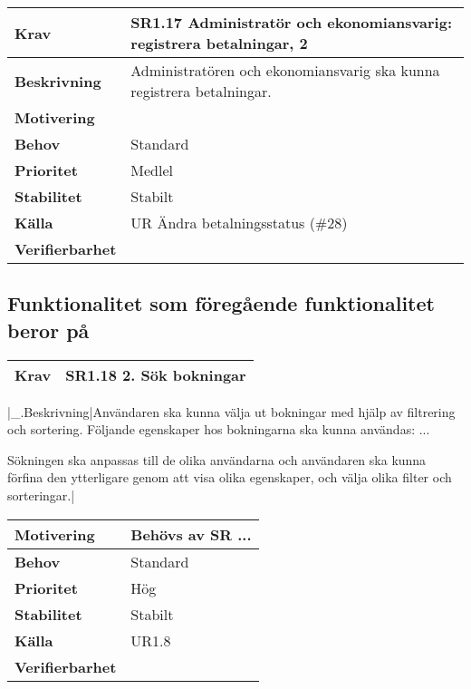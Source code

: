 \documentclass[a4paper, twoside, 11pt, titlepage]{article}
\begin{document}
	\begin{tabular} { p{2.6cm} p{12.5cm} }
		\hline
		\sffamily\textbf{Krav} & \sffamily\textbf{SR1.17 Administratör och ekonomiansvarig: registrera betalningar, 2 } \\
		\hline
		\sffamily\textbf{Beskrivning} & Administratören och ekonomiansvarig ska kunna registrera betalningar.  \\
		\hline
		\sffamily\textbf{Motivering} &   \\
		\hline
		\sffamily\textbf{Behov} & Standard  \\
		\hline
		\sffamily\textbf{Prioritet} & Medlel  \\
		\hline
		\sffamily\textbf{Stabilitet} & Stabilt  \\
		\hline
		\sffamily\textbf{Källa} & UR Ändra betalningsstatus (\#28)  \\
		\hline
		\sffamily\textbf{Verifierbarhet} &   \\
		\hline
	\end{tabular}


	\subsection{Funktionalitet som föregående funktionalitet beror på}


	\begin{tabular} { p{2.6cm} p{12.5cm} }
		\hline
		\sffamily\textbf{Krav} & \sffamily\textbf{SR1.18 2. Sök bokningar } \\
		\hline
	\end{tabular}
	\vspace{6mm}

	|\_.Beskrivning|Användaren ska kunna välja ut bokningar med hjälp av filtrering och sortering. Följande egenskaper hos bokningarna ska kunna användas: ...

	Sökningen ska anpassas till de olika användarna och användaren ska kunna förfina den ytterligare genom att visa olika egenskaper, och välja olika filter och sorteringar.|

	\begin{tabular} { p{2.6cm} p{12.5cm} }
		\hline
		\sffamily\textbf{Motivering} & Behövs av SR ...  \\
		\hline
		\sffamily\textbf{Behov} & Standard  \\
		\hline
		\sffamily\textbf{Prioritet} & Hög  \\
		\hline
		\sffamily\textbf{Stabilitet} & Stabilt  \\
		\hline
		\sffamily\textbf{Källa} & UR1.8  \\
		\hline
		\sffamily\textbf{Verifierbarhet} &   \\
		\hline
	\end{tabular}
	\vspace{6mm}
\end{document}
